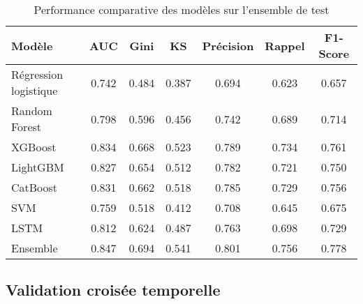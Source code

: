 \begin{table}[h]
\centering
\begin{tabular}{|l|c|c|c|c|c|c|}
\hline
\textbf{Modèle} & \textbf{AUC} & \textbf{Gini} & \textbf{KS} & \textbf{Précision} & \textbf{Rappel} & \textbf{F1-Score} \\
\hline
Régression logistique & 0.742 & 0.484 & 0.387 & 0.694 & 0.623 & 0.657 \\
Random Forest & 0.798 & 0.596 & 0.456 & 0.742 & 0.689 & 0.714 \\
XGBoost & 0.834 & 0.668 & 0.523 & 0.789 & 0.734 & 0.761 \\
LightGBM & 0.827 & 0.654 & 0.512 & 0.782 & 0.721 & 0.750 \\
CatBoost & 0.831 & 0.662 & 0.518 & 0.785 & 0.729 & 0.756 \\
SVM & 0.759 & 0.518 & 0.412 & 0.708 & 0.645 & 0.675 \\
LSTM & 0.812 & 0.624 & 0.487 & 0.763 & 0.698 & 0.729 \\
Ensemble & 0.847 & 0.694 & 0.541 & 0.801 & 0.756 & 0.778 \\
\hline
\end{tabular}
\caption{Performance comparative des modèles sur l'ensemble de test}
\end{table}

\subsection{Validation croisée temporelle}

